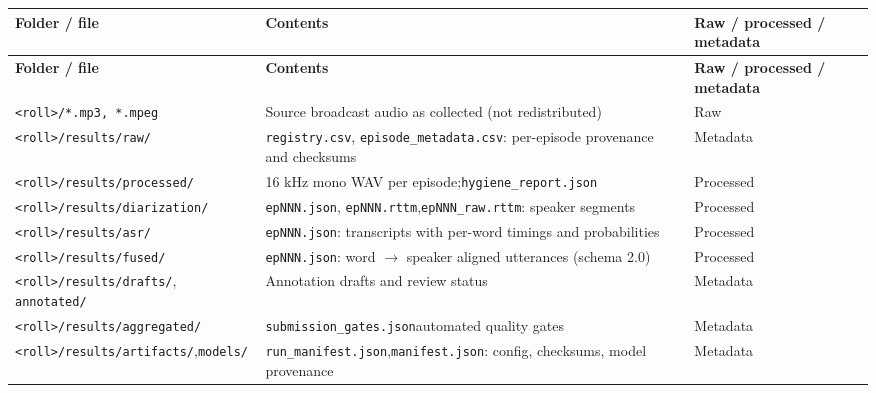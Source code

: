 \documentclass[11pt,a4paper]{article}
\newcommand{\thd}[1]{\textbf{\sffamily\small #1}}          %
\begin{document}
\begingroup\footnotesize
\begin{longtable}{|L{4.5cm}|L{7.4cm}|L{2.4cm}|}
\hline
\thd{Folder / file} & \thd{Contents} & \thd{Raw / processed / metadata} \\ \hline
\endfirsthead
\hline \thd{Folder / file} & \thd{Contents} & \thd{Raw / processed / metadata} \\ \hline \endhead
\texttt{<roll>/*.mp3, *.mpeg}          & Source broadcast audio as collected (not redistributed) & Raw \\ \hline
\texttt{<roll>/results/}\newline\texttt{raw/}           & \texttt{registry.csv}, \texttt{episode\_metadata.csv}: per-episode provenance and checksums & Metadata \\ \hline
\texttt{<roll>/results/}\newline\texttt{processed/}     & 16 kHz mono WAV per episode;\newline \texttt{hygiene\_report.json} & Processed \\ \hline
\texttt{<roll>/results/}\newline\texttt{diarization/}   & \texttt{epNNN.json}, \texttt{epNNN.rttm},\newline \texttt{epNNN\_raw.rttm}: speaker segments & Processed \\ \hline
\texttt{<roll>/results/}\newline\texttt{asr/}           & \texttt{epNNN.json}: transcripts with per-word timings and probabilities & Processed \\ \hline
\texttt{<roll>/results/}\newline\texttt{fused/}         & \texttt{epNNN.json}: word $\rightarrow$ speaker aligned utterances (schema 2.0) & Processed \\ \hline
\texttt{<roll>/results/}\newline\texttt{drafts/}, \texttt{annotated/} & Annotation drafts and review status & Metadata \\ \hline
\texttt{<roll>/results/}\newline\texttt{aggregated/}    & \texttt{submission\_gates.json}\newline automated quality gates & Metadata \\ \hline
\texttt{<roll>/results/}\newline\texttt{artifacts/},\newline \texttt{models/} & \texttt{run\_manifest.json},\newline \texttt{manifest.json}: config, checksums, model provenance & Metadata \\ \hline

\end{longtable}
\end{document}
